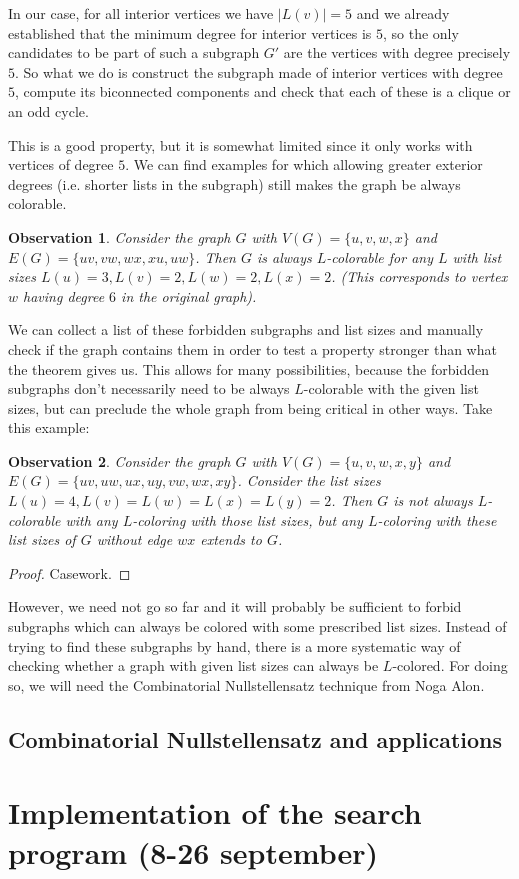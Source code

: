 \documentclass{article}
\newtheorem{observation}{Observation}
\begin{document}
In our case, for all interior vertices we have $|L(v)| = 5$ and we already established that the minimum degree for interior vertices is $5$, so the only candidates to be part of such a subgraph $G'$ are the vertices with degree precisely $5$. So what we do is construct the subgraph made of interior vertices with degree $5$, compute its biconnected components and check that each of these is a clique or an odd cycle. 

This is a good property, but it is somewhat limited since it only works with vertices of degree $5$. We can find examples for which allowing greater exterior degrees (i.e. shorter lists in the subgraph) still makes the graph be always colorable.

\begin{observation}
Consider the graph $G$ with $V(G) = \{u, v, w, x\}$ and $E(G) = \{uv, vw, wx, xu, uw\}$. Then $G$ is always $L$-colorable for any $L$ with list sizes $L(u) = 3, L(v) = 2, L(w) = 2, L(x) = 2$. (This corresponds to vertex $w$ having degree $6$ in the original graph).
\end{observation} 

We can collect a list of these forbidden subgraphs and list sizes and manually check if the graph contains them in order to test a property stronger than what the theorem gives us. This allows for many possibilities, because the forbidden subgraphs don't necessarily need to be always $L$-colorable with the given list sizes, but can preclude the whole graph from being critical in other ways. Take this example:

\begin{observation}
Consider the graph $G$ with $V(G) = \{u, v, w, x, y\}$ and $E(G) = \{uv, uw, ux, uy, vw, wx, xy \}$. Consider the list sizes $L(u) = 4, L(v) = L(w) = L(x) = L(y) = 2$. Then $G$ is not always $L$-colorable with any $L$-coloring with those list sizes, but any $L$-coloring with these list sizes of $G$ without edge $wx$ extends to $G$.
\end{observation}

\begin{proof}
Casework.

\end{proof}

However, we need not go so far and it will probably be sufficient to forbid subgraphs which can always be colored with some prescribed list sizes. Instead of trying to find these subgraphs by hand, there is a more systematic way of checking whether a graph with given list sizes can always be $L$-colored. For doing so, we will need the Combinatorial Nullstellensatz technique from Noga Alon. 




\subsection{Combinatorial Nullstellensatz and applications}

\section{Implementation of the search program (8-26 september)}

\newpage

\printbibliography
\end{document}
